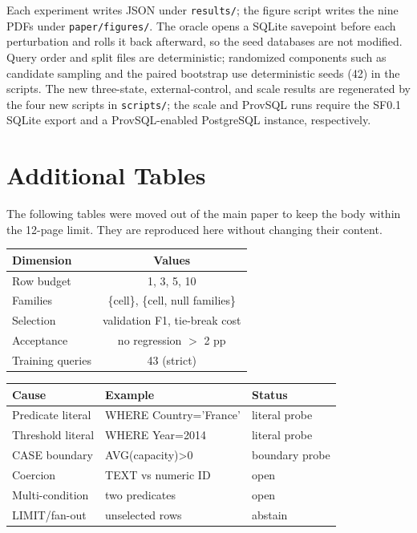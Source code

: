 \documentclass[sigconf, nonacm]{acmart}
\begin{document}
Each experiment writes JSON under \texttt{results/}; the figure script writes the nine PDFs under \texttt{paper/figures/}. The oracle opens a SQLite savepoint before each perturbation and rolls it back afterward, so the seed databases are not modified. Query order and split files are deterministic; randomized components such as candidate sampling and the paired bootstrap use deterministic seeds (42) in the scripts. The new three-state, external-control, and scale results are regenerated by the four new scripts in \texttt{scripts/}; the scale and ProvSQL runs require the SF0.1 SQLite export and a ProvSQL-enabled PostgreSQL instance, respectively.

\clearpage
\section{Additional Tables}

The following tables were moved out of the main paper to keep the body within the 12-page limit. They are reproduced here without changing their content.

\begin{center}
\label{tab:policy}
\begin{tabular}{lc}
\toprule
Dimension & Values \\
\midrule
Row budget & 1, 3, 5, 10 \\
Families & \{cell\}, \{cell, null families\} \\
Selection & validation F1, tie-break cost \\
Acceptance & no regression $>$ 2 pp \\
Training queries & 43 (strict) \\
\bottomrule
\end{tabular}
\end{center}

\begin{center}
\label{tab:taxonomy}
\small
\begin{tabular}{lll}
\toprule
Cause & Example & Status \\
\midrule
Predicate literal & WHERE Country='France' & literal probe \\
Threshold literal & WHERE Year=2014 & literal probe \\
CASE boundary & AVG(capacity)>0 & boundary probe \\
Coercion & TEXT vs numeric ID & open \\
Multi-condition & two predicates & open \\
LIMIT/fan-out & unselected rows & abstain \\
\bottomrule
\end{tabular}
\end{center}
\end{document}
